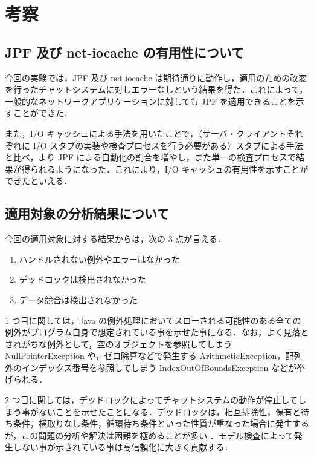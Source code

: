 \documentclass[a4j,12pt]{jarticle}
\begin{document}
\section{考察}

\subsection{JPF 及び net-iocache の有用性について}

今回の実験では，JPF 及び net-iocache は期待通りに動作し，適用のための改変を行ったチャットシステムに対しエラーなしという結果を得た．これによって，一般的なネットワークアプリケーションに対しても JPF を適用できることを示すことができた．

また，I/O キャッシュによる手法を用いたことで，（サーバ・クライアントそれぞれに I/O スタブの実装や検査プロセスを行う必要がある）スタブによる手法と比べ，より JPF による自動化の割合を増やし，また単一の検査プロセスで結果が得られるようになった．これにより，I/O キャッシュの有用性を示すことができたといえる．

\subsection{適用対象の分析結果について}

今回の適用対象に対する結果からは，次の 3 点が言える．

\begin{enumerate}
\item ハンドルされない例外やエラーはなかった
\item デッドロックは検出されなかった
\item データ競合は検出されなかった
\end{enumerate}

1 つ目に関しては，Java の例外処理においてスローされる可能性のある全ての例外がプログラム自身で想定されている事を示せた事になる．なお，よく見落とされがちな例外として，空のオブジェクトを参照してしまう NullPointerException や，ゼロ除算などで発生する ArithmeticException，配列外のインデックス番号を参照してしまう IndexOutOfBoundsException などが挙げられる．

2 つ目に関しては，デッドロックによってチャットシステムの動作が停止してしまう事がないことを示せたことになる．デッドロックは，相互排除性，保有と待ち条件，横取りなし条件，循環待ち条件といった性質が重なった場合に発生するが，この問題の分析や解決は困難を極めることが多い \cite{MOS2}．モデル検査によって発生しない事が示されている事は高信頼化に大きく貢献する．
\end{document}
